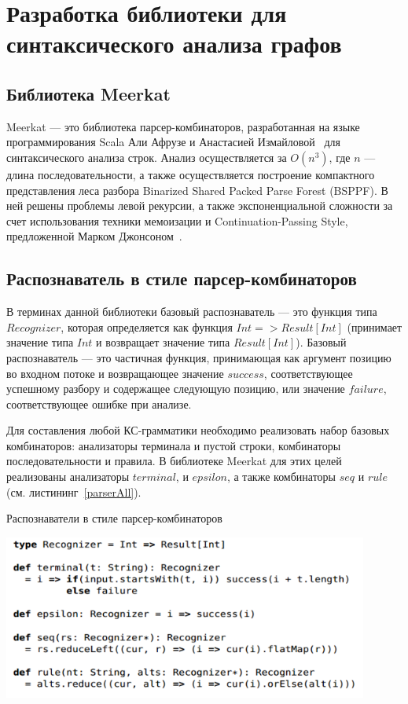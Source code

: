 \section{Разработка библиотеки для синтаксического анализа графов}
\subsection{Библиотека Meerkat}
Meerkat --- это библиотека парсер-комбинаторов, разработанная на языке программирования Scala Али Афрузе и Анастасией Измайловой~\cite{IzmCombinator} для синтаксического анализа строк. Анализ осуществляется за $O(n^3)$, где $n$ --- длина последовательности, а также осуществляется построение компактного представления леса разбора Binarized Shared Packed Parse Forest (BSPPF). В ней решены проблемы левой рекурсии, а также экспоненциальной сложности за счет использования техники мемоизации и Continuation-Passing Style, предложенной Марком Джонсоном~\cite{MemoizationInTopDown}.

\subsection{Распознаватель в стиле парсер-комбинаторов}
В терминах данной библиотеки базовый распознаватель --- это функция типа $Recognizer$, которая определяется как функция $Int => Result[Int]$ (принимает значение типа $Int$ и возвращает значение типа $Result[Int]$). Базовый распознаватель --- это частичная функция, принимающая как аргумент позицию во входном потоке и возвращающее значение $success$, соответствующее успешному разбору и содержащее следующую позицию, или значение $failure$, соответствующее ошибке при анализе.

Для составления любой КС-грамматики необходимо реализовать набор базовых комбинаторов: анализаторы терминала и пустой строки, комбинаторы последовательности и правила. В библиотеке Meerkat для этих целей реализованы анализаторы $terminal$, и $epsilon$, а также комбинаторы $seq$ и $rule$ (см. листининг~\ref{parserAll}).

\begin{listing}
\caption{Распознаватели в стиле парсер-комбинаторов}
\label{parserAll}
\centering
\includegraphics[width=0.9\textwidth]{Smolina/pics/combinators.png}
\end{listing}

